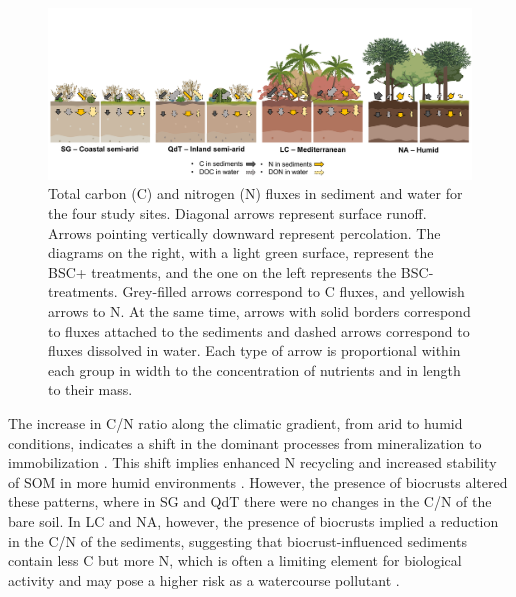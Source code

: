 \begin{figure}[H]
	\centering
	\includegraphics[width=1\textwidth]{img/M2-Figure_4.png}
	\caption{Total carbon (C) and nitrogen (N) fluxes in sediment and water for the four study sites. Diagonal arrows represent surface runoff. Arrows pointing vertically downward represent percolation. The diagrams on the right, with a light green surface, represent the BSC+ treatments, and the one on the left represents the BSC- treatments. Grey-filled arrows correspond to C fluxes, and yellowish arrows to N. At the same time, arrows with solid borders correspond to fluxes attached to the sediments and dashed arrows correspond to fluxes dissolved in water. Each type of arrow is proportional within each group in width to the concentration of nutrients and in length to their mass.}
	\label{fig:M2-F4}
\end{figure}

\FloatBarrier

The increase in C/N ratio along the climatic gradient, from arid to humid conditions, indicates a shift in the dominant processes from mineralization to immobilization \citep{Brust2019}. This shift implies enhanced N recycling and increased stability of SOM in more humid environments \citep{Oeser2020}. However, the presence of biocrusts altered these patterns, where in SG and QdT there were no changes in the C/N of the bare soil. In LC and NA, however, the presence of biocrusts implied a reduction in the C/N of the sediments, suggesting that biocrust-influenced sediments contain less C but more N, which is often a limiting element for biological activity \citep{Hanrahan2005} and may pose a higher risk as a watercourse pollutant \citep{Dodds2016}.

